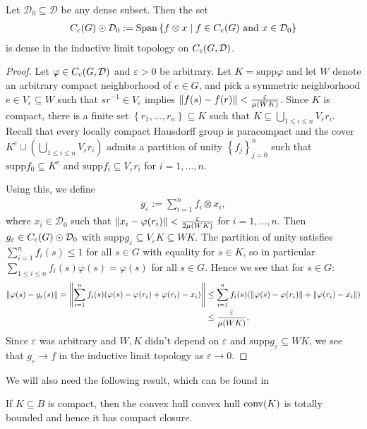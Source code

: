 \begin{lemma}
Let $\mathcal{D}_0 \subseteq \mathcal{D}$ be any dense subset. Then the set
\begin{align*}
C_c(G) \odot \mathcal{D}_0 := \mathrm{Span}\left\{ f \otimes x \mid f \in C_c(G) \text{ and } x \in \mathcal{D}_0 \right\} 
\end{align*}
is dense in the inductive limit topology on $C_c(G,\mathcal{D})$.
\label{int:indlmdense}
\end{lemma}
\begin{proof}	
Let $\varphi \in C_c(G,\mathcal{D})$ and $\varepsilon > 0$ be arbitrary. Let $K= \mathrm{supp} \varphi$ and let $W$ denote an arbitrary compact neighborhood of $e \in G$, and pick a symmetric neighborhood $e \in V_{\varepsilon} \subseteq W$ such that $sr^{-1} \in V_\varepsilon$ implies $\left\lVert f(s) - f(r) \right\rVert < \frac{\varepsilon}{\mu(WK)}$. Since $K$ is compact, there is a finite set $\left\{ r_1,\dots,r_n \right\} \subseteq K$ such that $K \subseteq \bigcup_{1 \leq i \leq n} V_\varepsilon r_i$. Recall that every locally compact Hausdorff group is paracompact and the cover $K^c \cup \left( \bigcup_{1 \leq i \leq n } V_\varepsilon r_i \right)$ admits a partition of unity $\left\{ f_j \right\}_{j=0}^n$ such that $\mathrm{supp}f_0 \subseteq K^c$ and $\mathrm{supp}f_i \subseteq V_\varepsilon r_i$ for $i = 1 ,\dots,n$. 

Using this, we define
\begin{align*}
	g_\varepsilon := \sum_{i=1}^n f_i \otimes x_i,
\end{align*}
where $x_i \in \mathcal{D}_0$ such that $\left\lVert x_i - \varphi(r_i)\right\rVert < \frac{\varepsilon}{2\mu(WK)}$ for $i = 1,\dots,n$. Then $g_\varepsilon \in C_c(G) \odot \mathcal{D}_0$ with $\mathrm{supp} g_\varepsilon \subseteq V_\varepsilon K \subseteq W K$. The partition of unity satisfies $\sum_{i=1}^n f_i(s) \leq 1$ for all $s \in G$ with equality for $s \in K$, so in particular $\sum_{1 \leq i \leq n}f_i(s) \varphi(s) = \varphi(s)$ for all $s \in G$. Hence we see that for $s \in G$: 
\begin{align*}
	\left\lVert\varphi(s) - g_{\varepsilon}(s)\right\rVert = \left\lVert \sum_{i=1}^n f_i(s)(\varphi(s) - \varphi(r_i)+\varphi(r_i)-x_i)\right\rVert &\leq \sum_{i=1}^n f_i(s) (\left\lVert \varphi(s) - \varphi(r_i)\right\rVert+\left\lVert \varphi(r_i)-x_i\right\rVert) \\
	&\leq \frac{\varepsilon}{\mu(WK)},
\end{align*}
Since $\varepsilon$ was arbitrary and $W,K$ didn't depend on $\varepsilon$ and $ \mathrm{supp} g_\varepsilon \subseteq WK$, we see that $g_\varepsilon \to f$ in the inductive limit topology as $\varepsilon \to 0$.
\end{proof}
We will also need the following result, which can be found in \cite[Theorem 3.20, part (b, c)]{rudin1991functional}
\begin{lemma}
If $K \subseteq B$ is compact, then the convex hull convex hull $\operatorname{conv}(K)$ is totally bounded and hence it has compact closure.
\label{int:clconvcomp}
\end{lemma}


